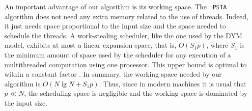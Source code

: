 An important advantage of our algorithm is its working space. The {\tt
PSTA} algorithm does not need any extra memory related to the use of
threads. Indeed, it just needs space proportional to the input size
and the space needed to schedule the threads. A work-stealing
scheduler, like the one used by the DYM model, exhibits at most a
linear expansion space, that is, $O(S_1p)$, where $S_1$ is the minimum
amount of space used by the scheduler for any execution of a
multithreaded computation using one processor. This upper bound is
optimal to within a constant factor
\cite{Blumofe:1999:SMC:324133.324234}. In summary, the working space
needed by our algorithm is $O(N\lg N+S_1p)$. Thus, since in modern
machines it is usual that $p\ll N$, the scheduling space is negligible
and the working space is dominated by the input size.

